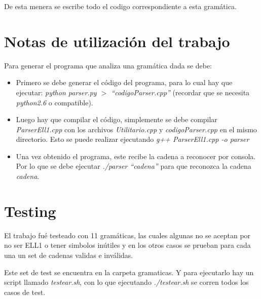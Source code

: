 \documentclass[a4paper]{report}
\begin{document}
De esta menera se escribe todo el codigo correspondiente a esta gramática.

\section*{Notas de utilización del trabajo}

Para generar el programa que analiza una gramática dada se debe:
\begin{itemize}
\item Primero se debe generar el código del programa, para lo cual hay que ejecutar: \emph{python parser.py $>$ ``codigoParser.cpp''} (recordar que se necesita \emph{python2.6} o compatible).
\item Luego hay que compilar el código, simplemente se debe compilar \emph{ParserEll1.cpp} con los archivos \emph{Utilitario.cpp} y \emph{codigoParser.cpp} en el mismo directorio. Esto se puede realizar ejecutando \emph{g++ ParserEll1.cpp -o parser}
\item Una vez obtenido el programa, este recibe la cadena a reconocer por consola. Por lo que se debe ejecutar \emph{./parser ``cadena''} para que reconozca la cadena \emph{cadena}.
\end{itemize}

\section*{Testing}

El trabajo fué testeado con 11 gramáticas, las cuales algunas no se aceptan por no ser ELL1 o tener simbolos inútiles y en los otros casos se prueban para cada una un set de cadenas validas e inválidas.

Este set de test se encuentra en la carpeta gramaticas. Y para ejecutarlo hay un script llamado \emph{testear.sh}, con lo que ejecutando \emph{./testear.sh} se corren todos los casos de test.
\end{document}
